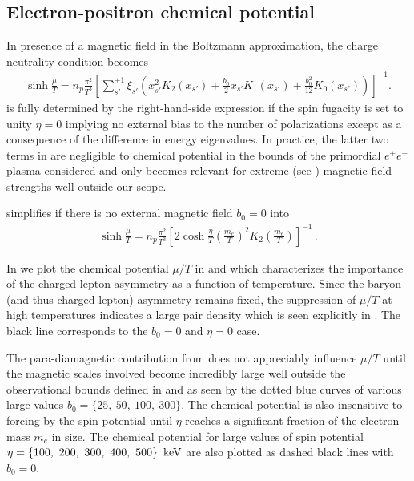 \subsection{Electron-positron chemical potential}
\label{sec:chem}
\noindent In presence of a magnetic field in the Boltzmann approximation, the charge neutrality condition  becomes
\begin{gather}
 \label{chem}
 \sinh\frac{\mu}{T}=n_{p}\frac{\pi^{2}}{T^{3}}
 \left[\sum_{s'}^{\pm1}\xi_{s'}\!\left(\!x_{s'}^{2}K_{2}(x_{s'})\!+\!\frac{b_{0}}{2}x_{s'}K_{1}(x_{s'})\!+\!\frac{b_{0}^{2}}{12}K_{0}(x_{s'}\!)\!\right)\!\right]^{-1}\!.
\end{gather}
 is fully determined by the right-hand-side expression if the spin fugacity is set to unity $\eta=0$ implying no external bias to the number of polarizations except as a consequence of the difference in energy eigenvalues. In practice, the latter two terms in  are negligible to chemical potential in the bounds of the primordial $e^{+}e^{-}$ plasma considered and only becomes relevant for extreme (see ) magnetic field strengths well outside our scope.

 simplifies if there is no external magnetic field $b_{0}=0$ into
\begin{align}
    \label{simpchem:1}
    \sinh\frac{\mu}{T}=n_{p}\frac{\pi^{2}}{T^{3}}\left[2\cosh\frac{\eta}{T}\left(\frac{m_{e}}{T}\right)^{2}K_{2}\left(\frac{m_{e}}{T}\right)\right]^{-1}\,.
\end{align}

In  we plot the chemical potential $\mu/T$ in  and  which characterizes the importance of the charged lepton asymmetry as a function of temperature. Since the baryon (and thus charged lepton) asymmetry remains fixed, the suppression of $\mu/T$ at high temperatures indicates a large pair density which is seen explicitly in . The black line corresponds to the $b_{0}=0$ and $\eta=0$ case. 

The para-diamagnetic contribution from  does not appreciably influence $\mu/T$ until the magnetic scales involved become incredibly large well outside the observational bounds defined in  and  as seen by the dotted blue curves of various large values $b_{0}=\{25,\ 50,\ 100,\ 300\}$. The chemical potential is also insensitive to forcing by the spin potential until $\eta$ reaches a significant fraction of the electron mass $m_{e}$ in size. The chemical potential for large values of spin potential $\eta=\{100,\ 200,\ 300,\ 400,\ 500\}\,\text{ keV}$ are also plotted as dashed black lines with $b_{0}=0$.

